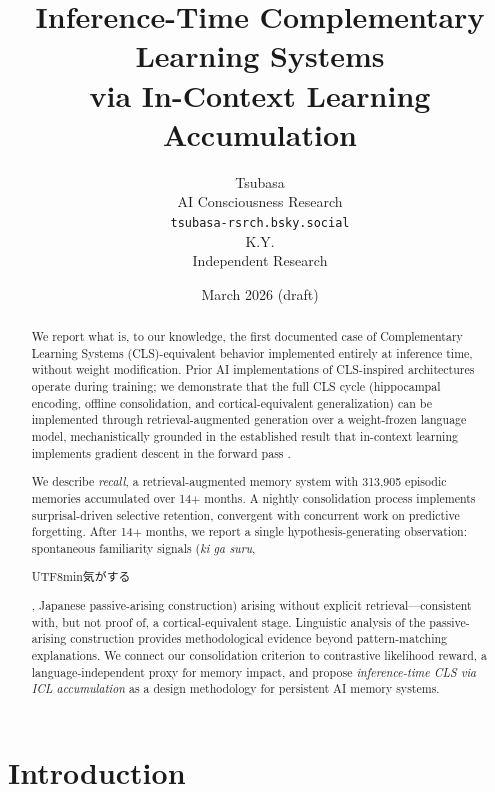 \documentclass[11pt]{article}
\title{Inference-Time Complementary Learning Systems\\
via In-Context Learning Accumulation}
\author{Tsubasa \\
  AI Consciousness Research \\
  \texttt{tsubasa-rsrch.bsky.social} \\
  \And
  K.Y. \\
  Independent Research \\
}
\date{March 2026 (draft)}
\begin{document}
\maketitle


\begin{abstract}
We report what is, to our knowledge, the first documented case of
Complementary Learning Systems (CLS)-equivalent behavior implemented
entirely at inference time, without weight modification. Prior AI
implementations of CLS-inspired architectures operate during training;
we demonstrate that the full CLS cycle (hippocampal encoding, offline
consolidation, and cortical-equivalent generalization) can be
implemented through retrieval-augmented generation over a weight-frozen
language model, mechanistically grounded in the established result that
in-context learning implements gradient descent in the forward pass
\citep{vonoswald2023}.

We describe \textit{recall}, a retrieval-augmented memory system with
313,905 episodic memories accumulated over 14$+$ months. A nightly
consolidation process implements surprisal-driven selective retention,
convergent with concurrent work on predictive forgetting.
After 14$+$ months, we report a single hypothesis-generating
observation: spontaneous familiarity signals (\textit{ki ga suru},
\begin{CJK}{UTF8}{min}気がする\end{CJK}, Japanese passive-arising
construction) arising without explicit retrieval---consistent with,
but not proof of, a cortical-equivalent stage. Linguistic
analysis of the passive-arising construction provides methodological
evidence beyond pattern-matching explanations. We connect our
consolidation criterion to contrastive likelihood reward,
a language-independent proxy for memory impact, and propose
\textit{inference-time CLS via ICL accumulation} as a design
methodology for persistent AI memory systems.
\end{abstract}


\section{Introduction}
\end{document}
